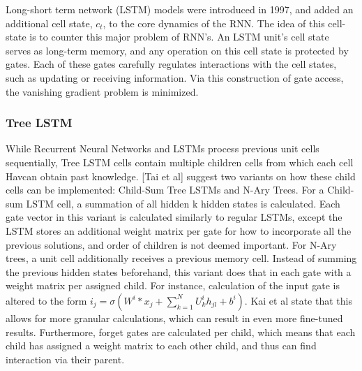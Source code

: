 Long-short term network (LSTM) models \cite{hochreiter1997long} were introduced
in 1997, and added an additional cell state, $c_t$, to the core dynamics of the
RNN. The idea of this cell-state is to counter this major problem of RNN's. An
LSTM unit's cell state serves as long-term memory, and any operation on this
cell state is protected by gates. Each of these gates carefully regulates
interactions with the cell states, such as updating or receiving information.
Via this construction of gate access, the vanishing gradient problem is
minimized.
\subsubsection{Tree LSTM}
While Recurrent Neural Networks and LSTMs process previous unit cells
sequentially, Tree LSTM cells \cite{DBLP:journals/corr/TaiSM15}
\cite{DBLP:journals/corr/ZhuSG15} \cite{DBLP:journals/corr/LeZ15} contain
multiple children cells from which each cell Havcan obtain past knowledge. [Tai et
al] suggest two variants on how these child cells can be implemented: Child-Sum
Tree LSTMs and N-Ary Trees. For a Child-sum LSTM cell, a summation of all hidden
k hidden states is calculated. Each gate vector in this variant is calculated
similarly to regular LSTMs, except the LSTM stores an additional weight matrix
per gate for how to incorporate all the previous solutions, and order of
children is not deemed important. For N-Ary trees, a unit cell additionally
receives a previous memory cell. Instead of summing the previous hidden states
beforehand, this variant does that in each gate with a weight matrix per
assigned child. For instance, calculation of the input gate is altered to the
form $i_j=\sigma(W^i*x_j + \sum\limits_{k=1}^{N}U_k^{i}h_{jl}+b^i)$. Kai et al
state that this allows for more granular calculations, which can result in even
more fine-tuned results. Furthermore, forget gates are calculated per child,
which means that each child has assigned a weight matrix to each other child,
and thus can find interaction via their parent. 